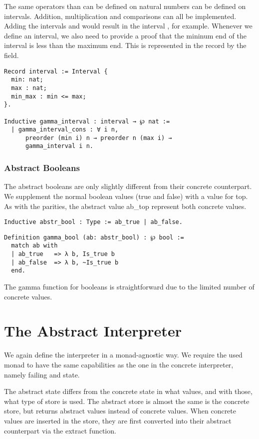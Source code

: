 The same operators than can be defined on natural numbers can be defined on
intervals. Addition, multiplication and comparisons can all be implemented.
Adding the intervals \coq{[1,3] } and \coq{[4, 7] }  would result in the 
interval \coq{[5, 10] }, for example. Whenever we define an interval, we also need to provide a
proof that the mininum end of the interval is less than the maximum end. This
is represented in the record by the  field.

\begin{listing}
\begin{verbatim}
Record interval := Interval {
  min: nat;
  max : nat;
  min_max : min <= max;
}.

Inductive gamma_interval : interval → ℘ nat :=
  | gamma_interval_cons : ∀ i n, 
      preorder (min i) n → preorder n (max i) →
      gamma_interval i n.
\end{verbatim}
\end{listing}

\subsubsection{Abstract Booleans}
The abstract booleans are only slightly different from their concrete
counterpart. We supplement the normal boolean values (true and false) with
a value for top. As with the parities, the abstract value ab\_top
represent both concrete values.

\begin{verbatim}
Inductive abstr_bool : Type := ab_true | ab_false.
\end{verbatim}

\begin{verbatim}
Definition gamma_bool (ab: abstr_bool) : ℘ bool :=
  match ab with
  | ab_true   => λ b, Is_true b
  | ab_false  => λ b, ~Is_true b
  end.
\end{verbatim}

The gamma function for booleans is straightforward due to the limited
number of concrete values. 

\section{The Abstract Interpreter}
We again define the interpreter in a monad-agnostic way. We require the
used monad to have the same capabilities as the one in the concrete
interpreter, namely failing and state.

The abstract state differs from the concrete state in what values, and with
those, what type of store is
used. The abstract store is almost the same is the concrete store, but returns
abstract values instead of concrete values. When concrete values are inserted
in the store, they are first converted into their abstract counterpart via the
extract function.

